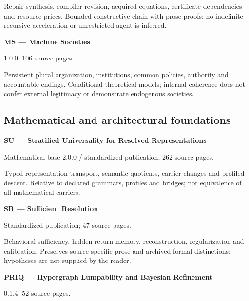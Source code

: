 Repair synthesis, compiler revision, acquired equations, certificate dependencies and resource prices. Bounded constructive chain with prose proofs; no indefinite recursive acceleration or unrestricted agent is inferred.\par

\hypertarget{cat:MS}{}\textbf{MS --- Machine Societies}\par

1.0.0; 106 source pages.\par

Persistent plural organization, institutions, common policies, authority and accountable endings. Conditional theoretical models; internal coherence does not confer external legitimacy or demonstrate endogenous societies.\par

\subsection*{Mathematical and architectural foundations}

\hypertarget{cat:SU}{}\textbf{SU --- Stratified Universality for Resolved Representations}\par

Mathematical base 2.0.0 / standardized publication; 262 source pages.\par

Typed representation transport, semantic quotients, carrier changes and profiled descent. Relative to declared grammars, profiles and bridges; not equivalence of all mathematical carriers.\par

\hypertarget{cat:SR}{}\textbf{SR --- Sufficient Resolution}\par

Standardized publication; 47 source pages.\par

Behavioral sufficiency, hidden-return memory, reconstruction, regularization and calibration. Preserves source-specific prose and archived formal distinctions; hypotheses are not supplied by the reader.\par

\hypertarget{cat:PRIQ}{}\textbf{PRIQ --- Hypergraph Lumpability and Bayesian Refinement}\par

0.1.4; 52 source pages.\par

